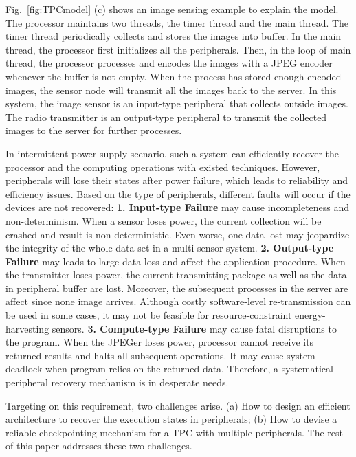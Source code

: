 Fig.~\ref{fig:TPCmodel} (c) shows an image sensing example to explain the model.
The processor maintains two threads, the timer thread and the main thread. 
The timer thread periodically collects and stores the images into buffer.
In the main thread, the processor first initializes all the peripherals.
Then, in the loop of main thread, the processor processes and encodes the images with a JPEG encoder whenever the buffer is not empty.
When the process has stored enough encoded images, the sensor node will transmit all the images back to the server.
In this system, the image sensor is an input-type peripheral that collects outside images.
The radio transmitter is an output-type peripheral to transmit the collected images to the server for further processes.


%
In intermittent power supply scenario, such a system can efficiently recover the processor and the computing operations with existed techniques. 
However, peripherals will lose their states after power failure, which leads to reliability and efficiency issues. 
Based on the type of peripherals, different faults will occur if the devices are not recovered: 
\textbf{1. Input-type Failure} may cause incompleteness and non-determinism. When a sensor loses power, the current collection will be crashed and result is non-deterministic. Even worse, one data lost may jeopardize the integrity of the whole data set in a multi-sensor system.
\textbf{2. Output-type Failure} may leads to large data loss and affect the application procedure. When the transmitter loses power, the current transmitting package as well as the data in peripheral buffer are lost. Moreover, the subsequent processes in the server are affect since none image arrives. Although costly software-level re-transmission can be used in some cases, it may not be feasible for resource-constraint energy-harvesting sensors. 
\textbf{3. Compute-type Failure} may cause fatal disruptions to the program. When the JPEGer loses power, processor cannot receive its returned results and halts all subsequent operations. It may cause system deadlock when program relies on the returned data.
Therefore, a systematical peripheral recovery mechanism is in desperate needs. 

Targeting on this requirement, two challenges arise.
(a) How to design an efficient architecture to recover the execution states in peripherals;
(b) How to devise a reliable checkpointing mechanism for a TPC with multiple peripherals.
The rest of this paper addresses these two challenges.

